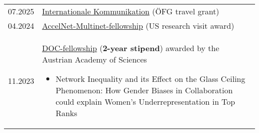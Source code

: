 
\begin{longtable}[l]{@{}p{} p{}}
    07.2025 & \href{https://www.oefg.at/foerderungen/internationale-kommunikation/}{Internationale Kommunikation} (\"OFG travel grant)\\
    04.2024 & \href{https://www.accelnet-multinet.org/}{AccelNet-Multinet-fellowship} (US research visit award)\\
    11.2023 & \href{https://stipendien.oeaw.ac.at/en/fellowships/doc}{DOC-fellowship} (\textbf{2-year stipend}) awarded by the Austrian Academy of Sciences
    \begin{itemize}
        \item \raggedright Network Inequality and its Effect on the Glass Ceiling Phenomenon: How Gender Biases in Collaboration could explain Women’s Underrepresentation in Top Ranks
    \end{itemize}

\end{longtable}
